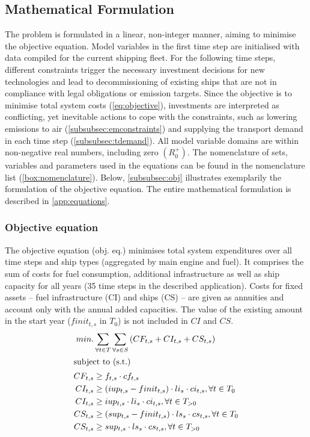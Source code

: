 \documentclass[article]{elsarticle}
\begin{document}
\subsection{Mathematical Formulation}
\label{subsec:Mat}
The problem is formulated in a linear, non-integer manner, aiming to minimise the objective equation. Model variables in the first time step are initialised with data compiled for the current shipping fleet. For the following time steps, different constraints trigger the necessary investment decisions for new technologies and lead to decommissioning of existing ships that are not in compliance with legal obligations or emission targets. Since the objective is to minimise total system costs  (\autoref{eq:objective}), investments are interpreted as conflicting, yet inevitable actions to cope with the constraints, such as lowering emissions to air (\ref{subsubsec:emconstraints}) and supplying the transport demand in each time step (\ref{subsubsec:tdemand}). All model variable domains are within non-negative real numbers, including zero $\left(R_{0}^{+}\right)$. The nomenclature of sets, variables and parameters used in the equations can be found in the nomenclature list (\ref{box:nomenclature}). Below, \autoref{subsubsec:obj} illustrates exemplarily the formulation of the objective equation. The entire mathematical formulation is described in \ref{app:equations}.

\subsubsection{Objective equation}\label{subsubsec:obj}
The objective equation (obj. eq.) minimises total system expenditures over all time steps and ship types (aggregated by main engine and fuel). It comprises the sum of  costs for fuel consumption, additional infrastructure as well as ship capacity for all years (35 time steps in the described application). Costs for fixed assets -- fuel infrastructure (CI) and ships (CS) -- are given as annuities and account only with the annual added capacities. The value of the existing amount in the start year ($finit_{t,s}$ in $T_0$) is not included in $CI$ and $CS$.
\begin{subequations}
    \begin{align}
        min. &\sum_{\forall t \in T}\sum_{\forall s \in S}\left( CF_{t, s} + CI_{t, s} + CS_{t, s} \right)\label{eq:objective}\\
        \intertext{subject to (s.t.)}
        CF_{t, s} &\geq f_{t,s} \cdot cf_{t,s}\\
        CI_{t, s} &\geq \left( iup_{t,s} - finit_{t, s} \right) \cdot li_{s} \cdot ci_{t,s}, \forall t \in T_0\\
        CI_{t, s} &\geq iup_{t,s} \cdot li_{s} \cdot ci_{t,s}, \forall t \in T_{>0}\\
        CS_{t, s} &\geq \left( sup_{t,s} - finit_{t, s} \right) \cdot ls_{s} \cdot cs_{t,s}, \forall t \in T_0\\
        CS_{t, s} &\geq sup_{t,s} \cdot ls_{s} \cdot cs_{t,s}, \forall t \in T_{>0}
    \end{align}
\end{subequations}
\end{document}
